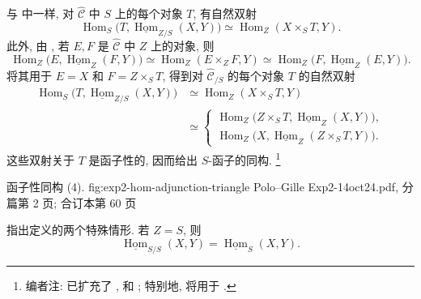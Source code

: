 与  中一样, 对
\(\widehat{\mathscr C}\) 中 \(S\) 上的每个对象 \(T\), 有自然双射
\begin{equation}
  \operatorname{Hom}_S
    \bigl(T,\underline{\operatorname{Hom}}_{Z/S}(X,Y)\bigr)
  \simeq \operatorname{Hom}_Z(X\times_S T,Y).
  \tag{2}\label{sga3:ii:section:1:equation:2}
\end{equation}
此外, 由 ,
若 \(E,F\) 是 \(\widehat{\mathscr C}\) 中 \(Z\) 上的对象, 则
\[
  \operatorname{Hom}_Z\bigl(E,\underline{\operatorname{Hom}}_Z(F,Y)\bigr)
  \simeq \operatorname{Hom}_Z(E\times_ZF,Y)
  \simeq
  \operatorname{Hom}_Z\bigl(F,\underline{\operatorname{Hom}}_Z(E,Y)\bigr).
\]
将其用于 \(E=X\) 和 \(F=Z\times_ST\), 得到对
\(\widehat{\mathscr C}_{/S}\) 的每个对象 \(T\) 的自然双射
\begin{equation}
\begin{aligned}
  \operatorname{Hom}_S
    \bigl(T,\underline{\operatorname{Hom}}_{Z/S}(X,Y)\bigr)
  &\simeq \operatorname{Hom}_Z(X\times_ST,Y)\\
  &\simeq
  \begin{cases}
    \operatorname{Hom}_Z\bigl(Z\times_ST,
      \underline{\operatorname{Hom}}_Z(X,Y)\bigr),\\
    \operatorname{Hom}_Z\bigl(X,
      \underline{\operatorname{Hom}}_Z(Z\times_ST,Y)\bigr).
  \end{cases}
\end{aligned}
\tag{3}\label{sga3:ii:section:1:equation:3}
\end{equation}
这些双射关于 \(T\) 是函子性的, 因而给出 \(S\)-函子的同构.
\footnote{编者注: 已扩充了 ,
 和 ;
特别地,  将用于
.}

  {函子性同构 (4).}
  {fig:exp2-hom-adjunction-triangle}
  {Polo--Gille Exp2-14oct24.pdf, 分篇第 2 页; 合订本第 60 页}

指出定义的两个特殊情形. 若 \(Z=S\), 则
\[
  \underline{\operatorname{Hom}}_{S/S}(X,Y)
  =\underline{\operatorname{Hom}}_S(X,Y).
\]


